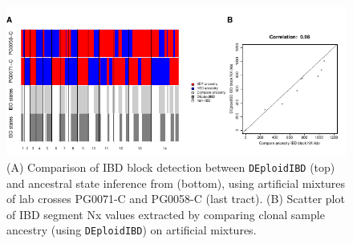 \documentclass[9pt,lineno]{elife}
\begin{document}
\begin{figure}[ht]
  \centering{}
  \includegraphics[width = \textwidth]{app3fig4.pdf}
  \caption{(A) Comparison of IBD block detection between {\tt DEploidIBD} (top) and ancestral state inference from \citet{Li2003} (bottom), using artificial mixtures of lab crosses PG0071-C and PG0058-C (last tract). (B) Scatter plot of IBD segment Nx values extracted by comparing clonal sample ancestry (using {\tt DEploidIBD}) on artificial mixtures.}\label{fig:bgibd}
\end{figure}
\end{document}
